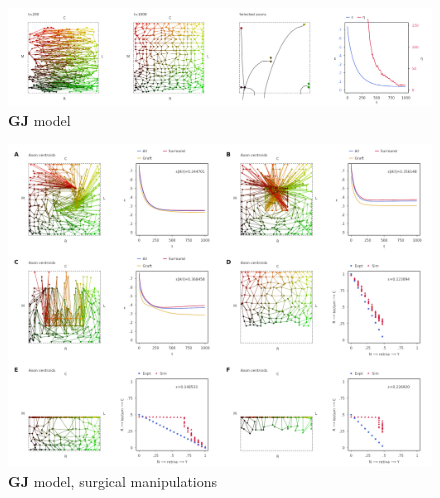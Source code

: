 \documentclass[11pt, a4paper, draft]{article}
\begin{document}
\begin{figure}
\includegraphics[width=\linewidth]{./images/j4_ee_GJ_best_1_wt_figcomp3.png}
\caption{$\mathbf{GJ}$ model}
\label{f:GJ}
\end{figure}

\begin{figure}
\includegraphics[width=\linewidth]{./images/fig_GJ_surgical.png}
\caption{$\mathbf{GJ}$ model, surgical manipulations}
\label{f:GJsurg}
\end{figure}
\end{document}
